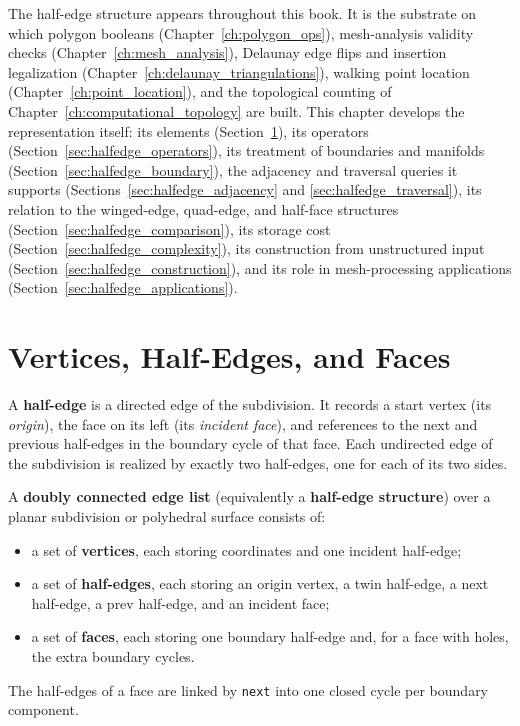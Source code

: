 The half-edge structure appears throughout this book. It is the substrate
on which polygon booleans (Chapter~\ref{ch:polygon_ops}), mesh-analysis
validity checks (Chapter~\ref{ch:mesh_analysis}), Delaunay edge flips and
insertion legalization (Chapter~\ref{ch:delaunay_triangulations}), walking
point location (Chapter~\ref{ch:point_location}), and the topological
counting of Chapter~\ref{ch:computational_topology} are built. This chapter
develops the representation itself: its elements
(Section~\ref{sec:halfedge_elements}), its operators
(Section~\ref{sec:halfedge_operators}), its treatment of boundaries and
manifolds (Section~\ref{sec:halfedge_boundary}), the adjacency and
traversal queries it supports (Sections~\ref{sec:halfedge_adjacency} and
\ref{sec:halfedge_traversal}), its relation to the winged-edge, quad-edge,
and half-face structures (Section~\ref{sec:halfedge_comparison}), its
storage cost (Section~\ref{sec:halfedge_complexity}), its construction from
unstructured input (Section~\ref{sec:halfedge_construction}), and its role
in mesh-processing applications (Section~\ref{sec:halfedge_applications}).

\section{Vertices, Half-Edges, and Faces}
\label{sec:halfedge_elements}

\begin{definition}\label{def:hed_halfedge}
A \textbf{half-edge} is a directed edge of the subdivision. It records a
start vertex (its \emph{origin}), the face on its left (its \emph{incident
face}), and references to the next and previous half-edges in the boundary
cycle of that face. Each undirected edge of the subdivision is realized by
exactly two half-edges, one for each of its two sides.
\end{definition}

\begin{definition}\label{def:hed_dcel}
A \textbf{doubly connected edge list} (equivalently a \textbf{half-edge
structure}) over a planar subdivision or polyhedral surface consists of:
\begin{itemize}
  \item a set of \textbf{vertices}, each storing coordinates and one
    incident half-edge;
  \item a set of \textbf{half-edges}, each storing an origin vertex, a twin
    half-edge, a next half-edge, a prev half-edge, and an incident face;
  \item a set of \textbf{faces}, each storing one boundary half-edge and,
    for a face with holes, the extra boundary cycles.
\end{itemize}
The half-edges of a face are linked by \texttt{next} into one closed cycle
per boundary component.
\end{definition}

